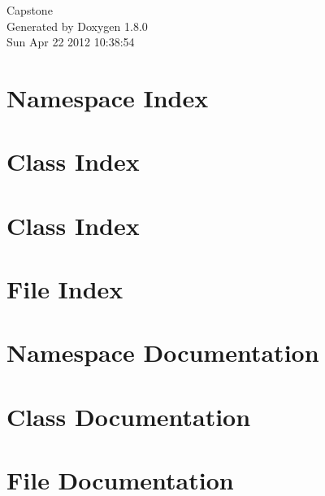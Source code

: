 \documentclass{book}
\begin{document}
\hypersetup{pageanchor=false,citecolor=blue}
\begin{titlepage}
\vspace*{7cm}
\begin{center}
{\Large Capstone }\\
\vspace*{1cm}
{\large Generated by Doxygen 1.8.0}\\
\vspace*{0.5cm}
{\small Sun Apr 22 2012 10:38:54}\\
\end{center}
\end{titlepage}
\clearemptydoublepage
{}
\tableofcontents
\clearemptydoublepage
{}
\hypersetup{pageanchor=true,citecolor=blue}
\chapter{Namespace Index}

\chapter{Class Index}

\chapter{Class Index}

\chapter{File Index}

\chapter{Namespace Documentation}







\chapter{Class Documentation}








\chapter{File Documentation}















\printindex
\end{document}
